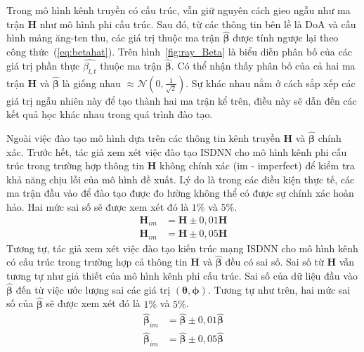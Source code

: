 Trong mô hình kênh truyền có cấu trúc, vẫn giữ nguyên cách gieo ngẫu như ma trận $\mathbf{H}$ như mô hình phi cấu trúc. Sau đó, từ các thông tin bên lề là DoA và cấu hình mảng ăng-ten thu, các giá trị thuộc ma trận $\hat{\boldsymbol{\beta}}$ được tính ngược lại theo công thức~(\ref{eq:betahat}). Trên hình~\ref{fig:ray_Beta} là biểu diễn phân bố của các giá trị phần thực $\hat{\beta_{l, t}}$ thuộc ma trận $\hat{\boldsymbol{\beta}}$. Có thể nhận thấy phân bố của cả hai ma trận $\mathbf{H}$ và $\hat{\boldsymbol{\beta}}$ là giống nhau $\approx \mathcal{N} (0, \frac{1}{\sqrt{2}})$. Sự khác nhau nằm ở cách sắp xếp các giá trị ngẫu nhiên này để tạo thành hai ma trận kể trên, điều này sẽ dẫn đến các kết quả học khác nhau trong quá trình đào tạo.

Ngoài việc đào tạo mô hình dựa trên các thông tin kênh truyền $\mathbf{H}$ và $\hat{\boldsymbol{\beta}}$ chính xác. Trước hết, tác giả xem xét việc đào tạo ISDNN cho mô hình kênh phi cấu trúc trong trường hợp thông tin $\mathbf{H}$ không chính xác (im - imperfect) để kiểm tra khả năng chịu lỗi của mô hình đề xuất. Lý do là trong các điều kiện thực tế, các ma trận đầu vào để đào tạo được đo lường không thể có được sự chính xác hoàn hảo. Hai mức sai số sẽ được xem xét đó là $1\%$ và $5\%$.
\begin{equation}
\begin{aligned}
     \mathbf{H}_{im} &= \mathbf{H} \pm 0,01\mathbf{H} \\
     \mathbf{H}_{im} &= \mathbf{H} \pm 0,05\mathbf{H}
\end{aligned}
\end{equation}
Tương tự, tác giả xem xét việc đào tạo kiến trúc mạng ISDNN cho mô hình kênh có cấu trúc trong trường hợp cả thông tin $\mathbf{H}$ và $\hat{\boldsymbol{\beta}}$ đều có sai số. Sai số từ $\mathbf{H}$ vẫn tương tự như giả thiết của mô hình kênh phi cấu trúc. Sai số của dữ liệu đầu vào $\hat{\boldsymbol{\beta}}$ đến từ việc ước lượng sai các giá trị $(\boldsymbol{\theta}, \boldsymbol{\phi})$. Tương tự như trên, hai mức sai số của $\hat{\boldsymbol{\beta}}$ sẽ được xem xét đó là $1\%$ và $5\%$.
\begin{equation}
\begin{aligned}
     \hat{\boldsymbol{\beta}}_{im} &= \hat{\boldsymbol{\beta}} \pm 0,01\hat{\boldsymbol{\beta}} \\
     \hat{\boldsymbol{\beta}}_{im} &= \hat{\boldsymbol{\beta}} \pm 0,05\hat{\boldsymbol{\beta}}
\end{aligned}
\end{equation}


